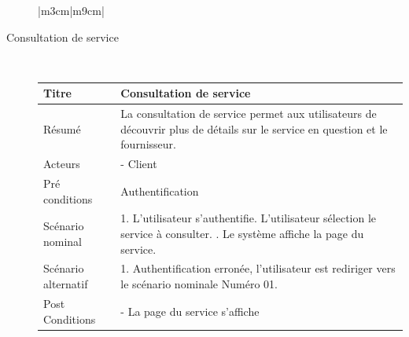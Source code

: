 \documentclass[french]{report}
\begin{document}
\begin{description}
\begin{minipage}{\linewidth}
\begin{tabular}{|m{3cm}|m{9cm}|}
            \\
            \hline
            \end{tabular}
        \end{minipage}
        
\newpage
        \item[Consultation de service] \hfill \newline \\
        \begin{minipage}{\linewidth}
        \centering
            \def\arraystretch{2}
            \begin{tabular}{|m{3cm}|m{9cm}|}
            \hline
            Titre                & Consultation de service                                                                                                 \\ 
            \hline
            Résumé               & La consultation de service permet aux utilisateurs de découvrir plus de détails sur le service en question et le fournisseur. \\ 
            \hline
            Acteurs              & - Client \\ 
            \hline
            Pré conditions       & Authentification                                                                                                      \\ 
            \hline
            Scénario nominal     &  
                1. L'utilisateur s'authentifie\newline
                2. L'utilisateur sélection le service à consulter. \newline
                3. Le système affiche la page du service.\newline
            \\ 
            \hline
            Scénario alternatif &   
                1. Authentification erronée, l'utilisateur est rediriger vers le scénario nominale Numéro 01.\newline
                
            \\ 
            \hline
            Post Conditions & 
                - La page du service s'affiche \newline
            \\
            \hline
            \end{tabular}
        \end{minipage}
        

\end{description}
\end{document}
